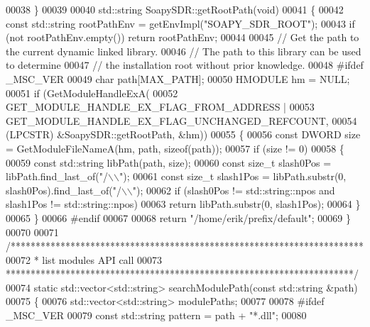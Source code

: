 \begin{DoxyCode}
00038 \}
00039 
00040 std::string SoapySDR::getRootPath(\textcolor{keywordtype}{void})
00041 \{
00042     \textcolor{keyword}{const} std::string rootPathEnv = getEnvImpl(\textcolor{stringliteral}{"SOAPY\_SDR\_ROOT"});
00043     \textcolor{keywordflow}{if} (not rootPathEnv.empty()) \textcolor{keywordflow}{return} rootPathEnv;
00044 
00045     \textcolor{comment}{// Get the path to the current dynamic linked library.}
00046     \textcolor{comment}{// The path to this library can be used to determine}
00047     \textcolor{comment}{// the installation root without prior knowledge.}
00048 \textcolor{preprocessor}{    #ifdef \_MSC\_VER}
00049     \textcolor{keywordtype}{char} path[MAX\_PATH];
00050     HMODULE hm = NULL;
00051     \textcolor{keywordflow}{if} (GetModuleHandleExA(
00052         GET\_MODULE\_HANDLE\_EX\_FLAG\_FROM\_ADDRESS |
00053         GET\_MODULE\_HANDLE\_EX\_FLAG\_UNCHANGED\_REFCOUNT,
00054         (LPCSTR) &SoapySDR::getRootPath, &hm))
00055     \{
00056         \textcolor{keyword}{const} DWORD size = GetModuleFileNameA(hm, path, \textcolor{keyword}{sizeof}(path));
00057         \textcolor{keywordflow}{if} (size != 0)
00058         \{
00059             \textcolor{keyword}{const} std::string libPath(path, size);
00060             \textcolor{keyword}{const} \textcolor{keywordtype}{size\_t} slash0Pos = libPath.find\_last\_of(\textcolor{stringliteral}{"/\(\backslash\)\(\backslash\)"});
00061             \textcolor{keyword}{const} \textcolor{keywordtype}{size\_t} slash1Pos = libPath.substr(0, slash0Pos).find\_last\_of(\textcolor{stringliteral}{"/\(\backslash\)\(\backslash\)"});
00062             \textcolor{keywordflow}{if} (slash0Pos != std::string::npos and slash1Pos != std::string::npos)
00063                 \textcolor{keywordflow}{return} libPath.substr(0, slash1Pos);
00064         \}
00065     \}
00066 \textcolor{preprocessor}{    #endif}
00067 
00068     \textcolor{keywordflow}{return} \textcolor{stringliteral}{"/home/erik/prefix/default"};
00069 \}
00070 
00071 \textcolor{comment}{/***********************************************************************}
00072 \textcolor{comment}{ * list modules API call}
00073 \textcolor{comment}{ **********************************************************************/}
00074 \textcolor{keyword}{static} std::vector<std::string> searchModulePath(\textcolor{keyword}{const} std::string &path)
00075 \{
00076     std::vector<std::string> modulePaths;
00077 
00078 \textcolor{preprocessor}{#ifdef \_MSC\_VER}
00079     \textcolor{keyword}{const} std::string pattern = path + \textcolor{stringliteral}{"*.dll"};
00080 

\end{DoxyCode}
